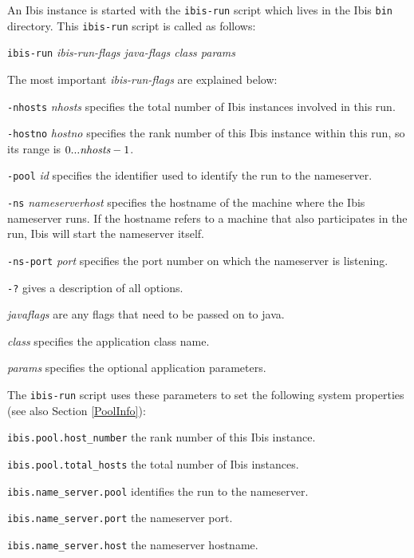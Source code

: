 \documentclass[10pt]{article}
\begin{document}
An Ibis instance is started with the \texttt{ibis-run} script which
lives in the Ibis \texttt{bin} directory.  This \texttt{ibis-run}
script is called as follows:
\begin{center}
\texttt{ibis-run} \emph{ibis-run-flags java-flags class params}
\end{center}
The most important \emph{ibis-run-flags} are explained below:
\begin{description}
\item{\texttt{-nhosts} \emph{nhosts}}
specifies the total number of Ibis instances involved in this run.
\item{\texttt{-hostno} \emph{hostno}}
specifies the rank number of this Ibis instance within this run,
so its range is $0 ... \emph{nhosts}-1$.
\item{\texttt{-pool} \emph{id}}
specifies the identifier used to identify the run to the nameserver.
\item{\texttt{-ns} \emph{nameserverhost}}
specifies the hostname of the machine where the Ibis nameserver runs.
If the hostname refers to a machine that also participates in the run,
Ibis will start the nameserver itself.
\item{\texttt{-ns-port} \emph{port}}
specifies the port number on which the nameserver is listening.
\item{\texttt{-?}}
gives a description of all options.
\item{\emph{javaflags}}
are any flags that need to be passed on to java.
\item{\emph{class}}
specifies the application class name.
\item{\emph{params}}
specifies the optional application parameters.
\end{description}

The \texttt{ibis-run} script uses these parameters to set the following
system properties (see also Section \ref{PoolInfo}):
\begin{description}
\item{\texttt{ibis.pool.host\_number}}
the rank number of this Ibis instance.
\item{\texttt{ibis.pool.total\_hosts}}
the total number of Ibis instances.
\item{\texttt{ibis.name\_server.pool}}
identifies the run to the nameserver.
\item{\texttt{ibis.name\_server.port}}
the nameserver port.
\item{\texttt{ibis.name\_server.host}}
the nameserver hostname.
\end{description}
\end{document}
